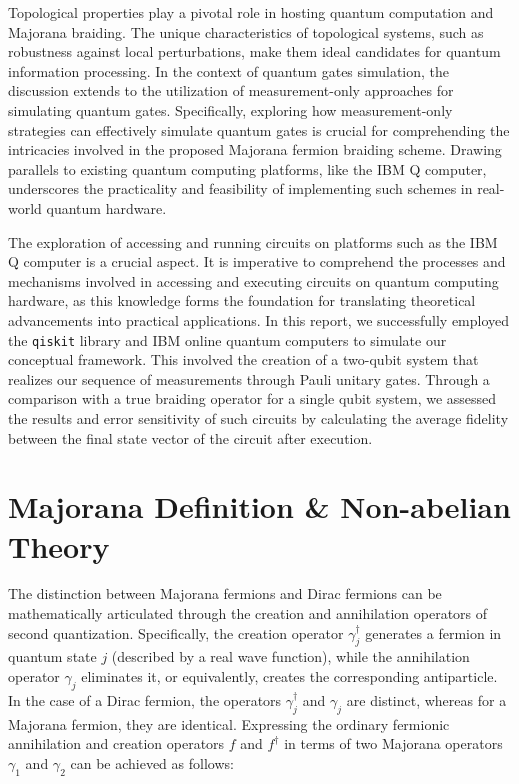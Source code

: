\documentclass{article}
\def\c#1{\texttt{#1}}
\begin{document}
Topological properties play a pivotal role in hosting quantum computation and Majorana braiding. The unique characteristics of topological systems, such as robustness against local perturbations, make them ideal candidates for quantum information processing. In the context of quantum gates simulation, the discussion extends to the utilization of measurement-only approaches for simulating quantum gates. Specifically, exploring how measurement-only strategies can effectively simulate quantum gates is crucial for comprehending the intricacies involved in the proposed Majorana fermion braiding scheme. Drawing parallels to existing quantum computing platforms, like the IBM Q computer, underscores the practicality and feasibility of implementing such schemes in real-world quantum hardware.

The exploration of accessing and running circuits on platforms such as the IBM Q computer is a crucial aspect. It is imperative to comprehend the processes and mechanisms involved in accessing and executing circuits on quantum computing hardware, as this knowledge forms the foundation for translating theoretical advancements into practical applications. In this report, we successfully employed the \c{qiskit} library and IBM online quantum computers to simulate our conceptual framework. This involved the creation of a two-qubit system that realizes our sequence of measurements through Pauli unitary gates. Through a comparison with a true braiding operator for a single qubit system, we assessed the results and error sensitivity of such circuits by calculating the average fidelity between the final state vector of the circuit after execution.

\section{Majorana Definition \& Non-abelian Theory} %
\label{sec:Majorana Definition}
The distinction between Majorana fermions and Dirac fermions can be mathematically articulated through the creation and annihilation operators of second quantization. Specifically, the creation operator $\gamma_j^{\dagger}$ generates a fermion in quantum state $j$ (described by a real wave function), while the annihilation operator $\gamma_j$ eliminates it, or equivalently, creates the corresponding antiparticle. In the case of a Dirac fermion, the operators $\gamma_j^{\dagger}$ and $\gamma_j$ are distinct, whereas for a Majorana fermion, they are identical. Expressing the ordinary fermionic annihilation and creation operators $f$ and $f^{\dagger}$ in terms of two Majorana operators $\gamma_1$ and $\gamma_2$ can be achieved as follows:
\end{document}
